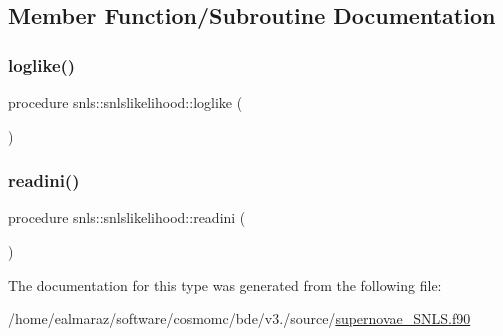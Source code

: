 \subsection{Member Function/\+Subroutine Documentation}
\mbox{\label{structsnls_1_1snlslikelihood_a6ea370a9ca22e4440e1590f038839bb5}} 
\subsubsection{\texorpdfstring{loglike()}{loglike()}}
{\footnotesize\ttfamily procedure snls\+::snlslikelihood\+::loglike (\begin{DoxyParamCaption}{ }\end{DoxyParamCaption})\hspace{0.3cm}{\ttfamily [private]}}

\mbox{\label{structsnls_1_1snlslikelihood_a80c40005273d3d4242d20a067bfd8262}} 
\subsubsection{\texorpdfstring{readini()}{readini()}}
{\footnotesize\ttfamily procedure snls\+::snlslikelihood\+::readini (\begin{DoxyParamCaption}{ }\end{DoxyParamCaption})\hspace{0.3cm}{\ttfamily [private]}}



The documentation for this type was generated from the following file\+:\begin{DoxyCompactItemize}
\item 
/home/ealmaraz/software/cosmomc/bde/v3./source/\mbox{\hyperlink{supernovae__SNLS_8f90}{supernovae\+\_\+\+S\+N\+L\+S.\+f90}}\end{DoxyCompactItemize}
